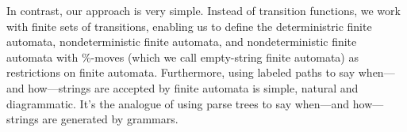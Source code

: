 In contrast, our approach is very simple.  Instead of transition
functions, we work with finite sets of transitions, enabling us to
define the deterministric finite automata, nondeterministic finite
automata, and nondeterministic finite automata with $\%$-moves (which
we call empty-string finite automata) as restrictions on finite
automata.  Furthermore, using labeled paths to say when---and
how---strings are accepted by finite automata is simple, natural and
diagrammatic.  It's the analogue of using parse trees to say
when---and how---strings are generated by grammars.


